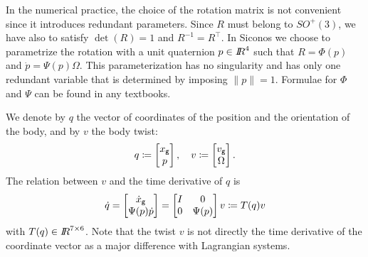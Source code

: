 In the numerical practice, the choice of the rotation matrix is not convenient since it introduces redundant parameters. Since $R$ must belong to $SO^+(3)$, we have also to satisfy $\det(R)=1$ and $R^{-1}=R^\top$. In Siconos we choose to parametrize the rotation with a unit quaternion $p \in \mbox{\rm $I\!\!R$}^4$ such that $R = \Phi(p)$ and $\dot p = \Psi(p)\Omega $. This parameterization has no singularity and has only one redundant variable that is determined by imposing $\|p\|=1$. Formulae for $\Phi$ and $\Psi$ can be found in any textbooks.

We denote  by $q$ the vector of coordinates of the position and the orientation of the body, and by $v$ {the body twist}:
\begin{equation}
  q \coloneqq \begin{bmatrix}
    x_{\sf \small g}\\
    p
  \end{bmatrix},\quad 
  v \coloneqq \begin{bmatrix}
     v_{\sf \small g}\\
     \Omega
   \end{bmatrix}.
 \end{equation}
 The relation between $v$ and the time derivative of $q$ is
\begin{equation}
  \label{eq:TT}
  \dot q = 
  \begin{bmatrix}
     \dot x_{\sf \small g}\\
     \Psi(p) \dot p
   \end{bmatrix}
   = 
   \begin{bmatrix}
     I & 0 \\
     0 & \Psi(p)
   \end{bmatrix}
   v
   \coloneqq
   T(q) v
\end{equation}
with $T(q) \in \mbox{\rm $I\!\!R$}^{7\times 6}$.
{Note that the twist $v$ is not directly the time derivative of the coordinate vector as a major difference with Lagrangian systems. }

